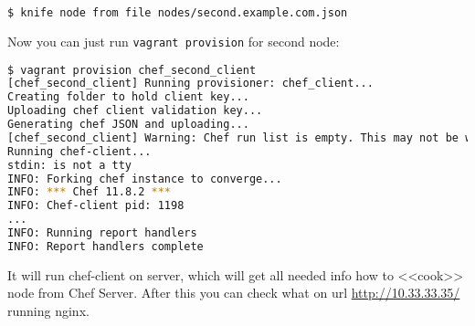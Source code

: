 \begin{lstlisting}[language=Bash,label=lst:my-serer-cloud-role7]
$ knife node from file nodes/second.example.com.json
\end{lstlisting}

Now you can just run \lstinline!vagrant provision! for second node:

\begin{lstlisting}[language=Bash,label=lst:my-serer-cloud-role8]
$ vagrant provision chef_second_client
[chef_second_client] Running provisioner: chef_client...
Creating folder to hold client key...
Uploading chef client validation key...
Generating chef JSON and uploading...
[chef_second_client] Warning: Chef run list is empty. This may not be what you want.
Running chef-client...
stdin: is not a tty
INFO: Forking chef instance to converge...
INFO: *** Chef 11.8.2 ***
INFO: Chef-client pid: 1198
...
INFO: Running report handlers
INFO: Report handlers complete
\end{lstlisting}

It will run chef-client on server, which will get all needed info how to <<cook>> node from Chef Server. After this you can check what on url \href{http://10.33.33.35/}{http://10.33.33.35/} running nginx.
